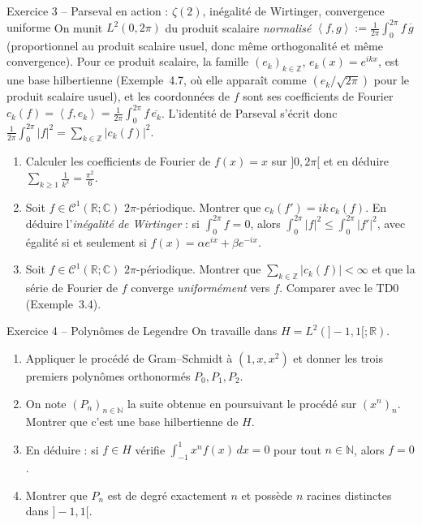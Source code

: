 \documentclass[11pt,a4paper]{article}
\newcommand{\R}{\mathbb{R}}
\newcommand{\N}{\mathbb{N}}
\newcommand{\Z}{\mathbb{Z}}
\newcommand{\C}{\mathbb{C}}
\newcommand{\ps}[2]{\left\langle #1,#2\right\rangle}
\theoremstyle{definition}
\begin{document}
\begin{exo}{Exercice 3 -- Parseval en action : $\zeta(2)$, inégalité de Wirtinger, convergence uniforme}
On munit $L^2(0,2\pi)$ du produit scalaire \emph{normalisé} $\ps fg:=\frac1{2\pi}\int_0^{2\pi}f\,\overline g$ (proportionnel au produit scalaire usuel, donc même orthogonalité et même convergence). Pour ce produit scalaire, la famille $(e_k)_{k\in\Z}$, $e_k(x)=e^{ikx}$, est une base hilbertienne (Exemple~4.7, où elle apparaît comme $(e_k/\sqrt{2\pi})$ pour le produit scalaire usuel), et les coordonnées de $f$ sont ses coefficients de Fourier $c_k(f)=\ps f{e_k}=\frac1{2\pi}\int_0^{2\pi}f\,\overline{e_k}$. L'identité de Parseval s'écrit donc $\frac1{2\pi}\int_0^{2\pi}|f|^2=\sum_{k\in\Z}|c_k(f)|^2$.
\begin{enumerate}[label=(\alph*)]
  \item Calculer les coefficients de Fourier de $f(x)=x$ sur $]0,2\pi[$ et en déduire $\sum_{k\ge1}\frac1{k^2}=\frac{\pi^2}6$.
  \item Soit $f\in\mathcal C^1(\R;\C)$ $2\pi$-périodique. Montrer que $c_k(f')=ik\,c_k(f)$. En déduire l'\emph{inégalité de Wirtinger} : si $\int_0^{2\pi}f=0$, alors $\int_0^{2\pi}|f|^2\le\int_0^{2\pi}|f'|^2$, avec égalité si et seulement si $f(x)=\alpha e^{ix}+\beta e^{-ix}$.
  \item Soit $f\in\mathcal C^1(\R;\C)$ $2\pi$-périodique. Montrer que $\sum_{k\in\Z}|c_k(f)|<\infty$ et que la série de Fourier de $f$ converge \emph{uniformément} vers $f$. Comparer avec le TD0 (Exemple~3.4).
\end{enumerate}
\end{exo}

\begin{exo}{Exercice 4 -- Polynômes de Legendre}
On travaille dans $H=L^2(]-1,1[;\R)$.
\begin{enumerate}[label=(\alph*)]
  \item Appliquer le procédé de Gram--Schmidt à $(1,x,x^2)$ et donner les trois premiers polynômes orthonormés $P_0,P_1,P_2$.
  \item On note $(P_n)_{n\in\N}$ la suite obtenue en poursuivant le procédé sur $(x^n)_n$. Montrer que c'est une base hilbertienne de $H$.
  \item En déduire : si $f\in H$ vérifie $\int_{-1}^1x^nf(x)\,dx=0$ pour tout $n\in\N$, alors $f=0$.
  \item Montrer que $P_n$ est de degré exactement $n$ et possède $n$ racines distinctes dans $]-1,1[$.
\end{enumerate}
\end{exo}
\end{document}
